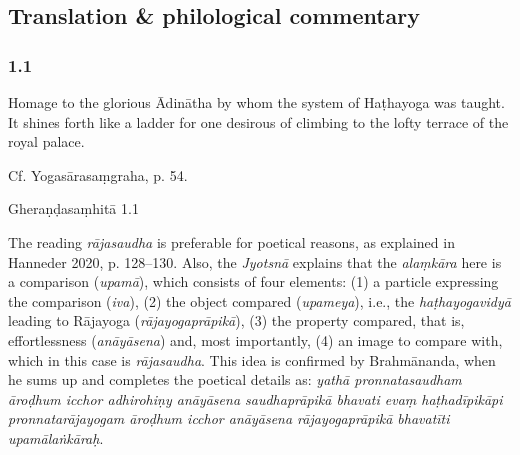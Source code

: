 


\pagestyle{HPed}
\begin{ekdosis}

\chapter*{Translation \& philological commentary}
\subsection*{1.1}
\begin{translation}[hp01_001]
Homage to the glorious Ādinātha by whom the system of Haṭhayoga was taught. It shines forth like a ladder for one desirous of climbing to the lofty terrace of the royal palace.
\end{translation}

\begin{testimonia}[hp01_001]
Cf. Yogasārasaṃgraha, p. 54.

\begin{versinnote}
\end{versinnote}

Gheraṇḍasaṃhitā 1.1

\begin{versinnote}
\end{versinnote}

\end{testimonia}

\begin{philcomm}[hp01_001]
The reading \emph{rājasaudha} is preferable for poetical reasons, as explained in Hanneder 2020, p. 128–130. Also, the \emph{Jyotsnā} explains that the \emph{alaṃkāra} here is a comparison (\emph{upamā}), which consists of four elements: (1) a particle expressing the comparison
(\emph{iva}), (2) the object compared (\emph{upameya}), i.e., the \emph{haṭhayogavidyā} leading to Rājayoga (\emph{rājayogaprāpikā}), (3) the property compared, that is, effortlessness (\emph{anāyāsena}) and, most importantly, (4) an image to compare with, which in this case is \emph{rājasaudha}. This idea is confirmed by Brahmānanda, when he sums up and completes the poetical details as: \emph{yathā pronnatasaudham āroḍhum icchor adhirohiṇy anāyāsena saudhaprāpikā bhavati evaṃ haṭhadīpikāpi pronnatarājayogam āroḍhum icchor anāyāsena rājayogaprāpikā bhavatīti upamālaṅkāraḥ}.


\end{philcomm}
\end{ekdosis}
